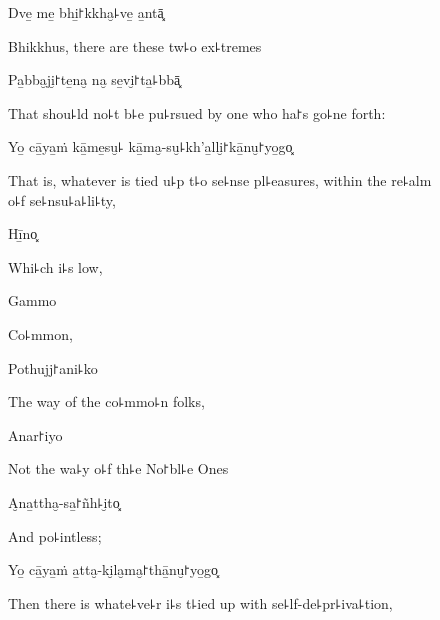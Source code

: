 
\begin{leader}
\end{leader}

Dve̱ me̱ bhi̱꜓kkha̮꜕ve̱ a̱ntā͓

\begin{english}
  Bhikkhus, there are these tw꜕o ex꜕tremes
\end{english}

Pa̱bba̮ji̮꜓te̱na̮ na̮ se̱vi̮꜓ta̱꜕bbā͓

\begin{english}
  That shou꜕ld no꜕t b꜕e pu꜕rsued by one who ha꜓s go꜕ne forth:
\end{english}

Yo̱ cā̱ya̱ṁ kā̱me̱su̮꜕ kā̱ma̮-su̮꜕kh'a̱lli̮꜓kā̱nu̮꜓yo̱go͓

\begin{english}
  That is, whatever is tied u꜕p t꜕o se꜕nse pl꜕easures, within the re꜕alm\\ o꜕f se꜕nsu꜕a꜕li꜕ty,
\end{english}

Hī̱no͓

\begin{english}
  Whi꜕ch i꜕s low,
\end{english}

Gammo

\begin{english}
  Co꜕mmon,
\end{english}

Pothujj꜓ani꜕ko

\begin{english}
  The way of the co꜕mmo꜕n folks,
\end{english}

Anar꜓iyo

\begin{english}
  Not the wa꜕y o꜕f th꜕e No꜓bl꜕e Ones
\end{english}

\clearpage

A̮na̱ttha̮-sa̱꜓ñh꜕i̮to͓

\begin{english}
  And po꜕intless;
\end{english}

Yo̱ cā̱ya̱ṁ a̱tta̮-ki̮la̮ma̮꜓thā̱nu̮꜓yo̱go͓

\begin{english}
  Then there is whate꜕ve꜕r i꜕s t꜕ied up with se꜕lf-de꜕pr꜕iva꜕tion,
\end{english}

